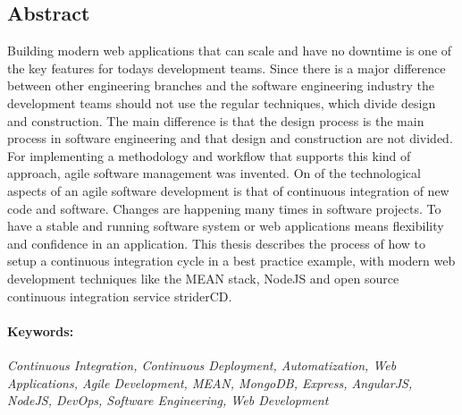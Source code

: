 \subsection*{Abstract}
Building modern web applications that can scale and have no downtime is one of the key features for todays development teams. Since there
is a major difference between other engineering branches and the software engineering industry the development teams should not use
the regular techniques, which divide design and construction. The main difference is that the design process is the main process in
software engineering and that design and construction are not divided. For implementing a methodology and workflow that supports
this kind of approach, agile software management was invented. On of the technological aspects of an agile software development is that
of continuous integration of new code and software. Changes are happening many times in software projects. To have a stable and running
software system or web applications means flexibility and confidence in an application. This thesis describes the process of how to setup
a continuous integration cycle in a best practice example, with modern web development techniques like the MEAN stack, NodeJS and open
source continuous integration service striderCD.  


\paragraph{Keywords:}
\textit{Continuous Integration, Continuous Deployment, Automatization, Web Applications, Agile Development, MEAN, MongoDB, Express, AngularJS, NodeJS, DevOps, Software Engineering, Web Development}
